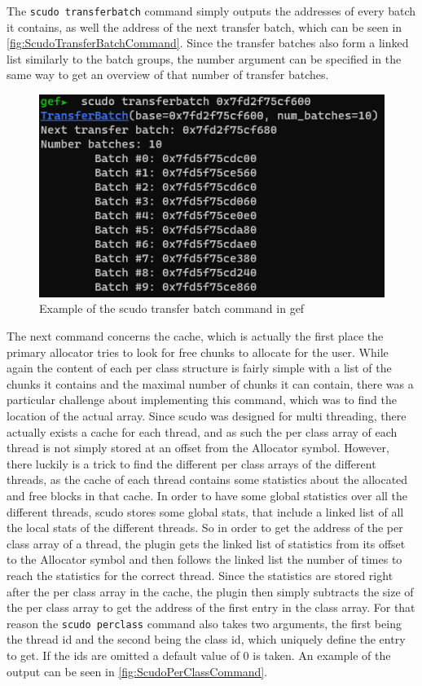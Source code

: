 \documentclass[a4paper,11pt,oneside]{report}
\begin{document}
The \verb|scudo transferbatch| command simply outputs the addresses of every batch
it contains, as well the address of the next transfer batch, which can be seen
in \autoref{fig:ScudoTransferBatchCommand}. Since the transfer batches also
form a linked list similarly to the batch groups, the number argument can be
specified in the same way to get an overview of that number of transfer batches.

\begin{figure}[h!]
  \centering
  \includegraphics{figures/ScudoTransferBatchCommand.png}
  \caption{Example of the scudo transfer batch command in gef}
  \label{fig:ScudoTransferBatchCommand}
\end{figure}

The next command concerns the cache, which is actually the first place the
primary allocator tries to look for free chunks to allocate for the user.
While again the content of each per class structure is fairly simple with a
list of the chunks it contains and the maximal number of chunks it can contain,
there was a particular challenge about implementing this command, which was to
find the location of the actual array. Since scudo was designed for multi
threading, there actually exists a cache for each thread, and as such the per
class array of each thread is not simply stored at an offset from the Allocator
symbol. However, there luckily is a trick to find the different per class arrays
of the different threads, as the cache of each thread contains some statistics
about the allocated and free blocks in that cache. In order to have some global
statistics over all the different threads, scudo stores some global stats, that
include a linked list of all the local stats of the different threads. So in
order to get the address of the per class array of a thread, the plugin gets
the linked list of statistics from its offset to the Allocator symbol and then
follows the linked list the number of times to reach the statistics for the
correct thread. Since the statistics are stored right after the per class array
in the cache, the plugin then simply subtracts the size of the per class array
to get the address of the first entry in the class array.
For that reason the \verb|scudo perclass| command also takes two arguments, the first
being the thread id and the second being the class id, which uniquely define
the entry to get. If the ids are omitted a default value of 0 is taken. An
example of the output can be seen in \autoref{fig:ScudoPerClassCommand}.
\end{document}
